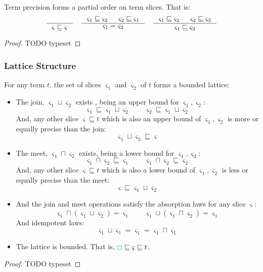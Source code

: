 \begin{proposition}
Term precision forms a partial order on term slices. That is:
\[\inference{}{\varsigma \sqsubseteq \varsigma} \quad \inference{\varsigma_1 \sqsubseteq \varsigma_2 & \varsigma_2 \sqsubseteq \varsigma_1}{\varsigma_1 = \varsigma_2} \quad \inference{\varsigma_1 \sqsubseteq \varsigma_2 & \varsigma_2 \sqsubseteq \varsigma_3}{\varsigma_1 \sqsubseteq \varsigma_3}\]
\end{proposition}
\begin{proof}
TODO typeset
\end{proof}

\subsubsection{Lattice Structure}
\begin{proposition}
For any term $t$, the set of slices $\varsigma_1$ and $\varsigma_2$ of $t$ forms a bounded lattice:
\begin{itemize}
\item The join, $\varsigma_1 \sqcup \varsigma_2$ exists , being an upper bound for $\varsigma_1, \varsigma_2$:
\[\varsigma_1 \sqsubseteq \varsigma_1 \sqcup \varsigma_2\qquad \varsigma_2 \sqsubseteq \varsigma_1 \sqcup \varsigma_2\]
And, any other slice $\varsigma \sqsubseteq t$ which is also an upper bound of $\varsigma_1, \varsigma_2$ is more or equally precise than the join:
\[\varsigma_1 \sqcup \varsigma_2 \sqsubseteq \varsigma\]
\item The meet, $\varsigma_1 \sqcap \varsigma_2$ exists, being a lower bound for $\varsigma_1, \varsigma_2$:
\[\varsigma_1 \sqcap \varsigma_2 \sqsubseteq \varsigma_1\qquad  \varsigma_1 \sqcap \varsigma_2 \sqsubseteq\varsigma_2\]
And, any other slice $\varsigma \sqsubseteq t$ which is also a lower bound of $\varsigma_1, \varsigma_2$ is less or equally precise than the meet:
\[ \varsigma \sqsubseteq\varsigma_1 \sqcup \varsigma_2\]
\item And the join and meet operations satisfy the absorption laws for any slice $\varsigma$:
\[\varsigma_1 \sqcap (\varsigma_1 \sqcup \varsigma_2) = \varsigma_1 \qquad \varsigma_1 \sqcup (\varsigma_1 \sqcap \varsigma_2) = \varsigma_1\]
And idempotent laws:
\[\varsigma_1 \sqcup \varsigma_1 = \varsigma_1 = \varsigma_1 \sqcap \varsigma_1\]
\item The lattice is bounded. That is, ${\color{teal}\Box} \sqsubseteq \varsigma \sqsubseteq t$.
\end{itemize}
\end{proposition}
\begin{proof}
TODO typeset
\end{proof}


